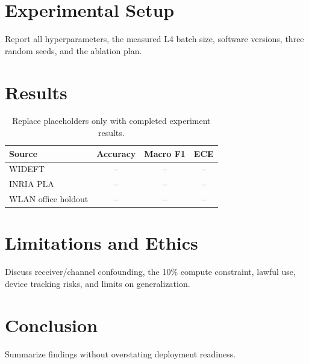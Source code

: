 \documentclass[sigconf,anonymous,review,balance=false]{acmart}
\begin{document}
\section{Experimental Setup}
Report all hyperparameters, the measured L4 batch size, software versions,
three random seeds, and the ablation plan.

\section{Results}
\begin{table}[t]
  \centering
  \caption{Replace placeholders only with completed experiment results.}
  \begin{tabular}{lccc}
    \toprule
    Source & Accuracy & Macro F1 & ECE \\
    \midrule
    WIDEFT & -- & -- & -- \\
    INRIA PLA & -- & -- & -- \\
    WLAN office holdout & -- & -- & -- \\
    \bottomrule
  \end{tabular}
\end{table}

\section{Limitations and Ethics}
Discuss receiver/channel confounding, the 10\% compute constraint, lawful use,
device tracking risks, and limits on generalization.

\section{Conclusion}
Summarize findings without overstating deployment readiness.



\end{document}
